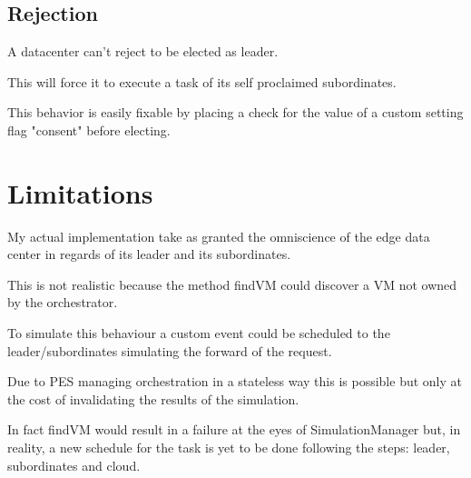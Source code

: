 \documentclass[12pt, a4paper]{report} %
\begin{document}
\subsection*{Rejection}
A datacenter can't reject to be elected as leader. 

This will force it to execute a task of its self proclaimed subordinates.

This behavior is easily fixable by placing a check for the value of a custom setting flag "consent" before electing.

\section*{Limitations}
My actual implementation take as granted the omniscience of the edge data center in regards of its leader and its subordinates.

This is not realistic because the method findVM could discover a VM not owned by the orchestrator.

To simulate this behaviour a custom event could be scheduled to the leader/subordinates simulating the forward of the request.

Due to PES managing orchestration in a stateless way this is possible but only at the cost of invalidating the results of the simulation.

In fact findVM would result in a failure at the eyes of SimulationManager but, in reality, a new schedule for the task is yet to be done following the steps: leader, subordinates and cloud.
\end{document}
